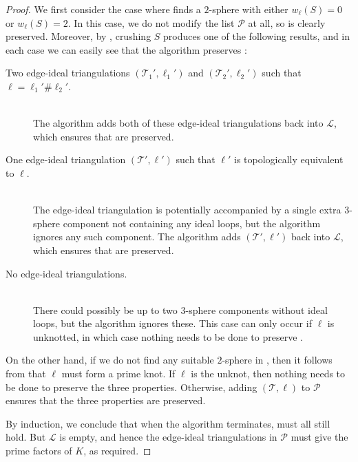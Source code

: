 \documentclass[10pt,a4paper]{amsart}
\newcommand{\tri}{\mathcal{T}}
\begin{document}
\begin{proof}
We first consider the case where  finds a $2$-sphere with either $w_\ell(S) = 0$ or $w_\ell(S) = 2$.
In this case, we do not modify the list $\mathcal{P}$ at all, so  is clearly preserved.
Moreover, by , crushing $S$ produces one of the following results,
and in each case we can easily see that the algorithm preserves :
\begin{description}
\item[Two edge-ideal triangulations $(\tri_1',\ell_1')$ and $(\tri_2',\ell_2')$ such that $\ell=\ell_1'\#\ell_2'$.]
\hfill\\
The algorithm adds both of these edge-ideal triangulations back into $\mathcal{L}$, which ensures that  are preserved.
\item[One edge-ideal triangulation $(\tri',\ell')$ such that $\ell'$ is topologically equivalent to $\ell$.]
\hfill\\
The edge-ideal triangulation is potentially accompanied by a single extra $3$-sphere component not containing any ideal loops, but the algorithm ignores any such component.
The algorithm adds $(\tri',\ell')$ back into $\mathcal{L}$, which ensures that  are preserved.
\item[No edge-ideal triangulations.]
\hfill\\
There could possibly be up to two $3$-sphere components without ideal loops, but the algorithm ignores these.
This case can only occur if $\ell$ is unknotted, in which case nothing needs to be done to preserve .
\end{description}

On the other hand, if we do not find any suitable $2$-sphere in , then it follows from  that $\ell$ must form a prime knot.
If $\ell$ is the unknot, then nothing needs to be done to preserve the three properties.
Otherwise, adding $(\tri,\ell)$ to $\mathcal{P}$ ensures that the three properties are preserved.

By induction, we conclude that when the algorithm terminates,  must all still hold.
But $\mathcal{L}$ is empty, and hence the edge-ideal triangulations in $\mathcal{P}$ must give the prime factors of $K$, as required.
\end{proof}
\end{document}
